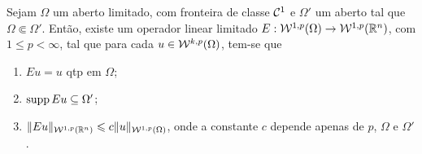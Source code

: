 \begin{tbox} \label{thm:extensao}
        Sejam $\Omega$ um aberto limitado, com fronteira de classe $\mathcal{C}^1$ e $\Omega'$ um aberto tal que $\Omega \Subset \Omega'$. Então, existe um operador linear limitado $E : \mathcal{W}^{1,p}(\Omega) \to \mathcal{W}^{1,p}(\mathbb{R} ^n)$, com $1 \leqslant p < \infty$, tal que para cada $u \in \mathcal{W}^{k,p}(\Omega)$, tem-se que
    \begin{enumerate}[leftmargin=*, label=\textbf{(\alph*)}]
        \item $Eu = u$ qtp em $\Omega$;
        \item $\mathrm{supp}\, Eu \subseteq \Omega'$;
        \item $\Vert Eu \Vert_{\mathcal{W}^{1,p}(\mathbb{R}^n)} \leqslant c \Vert u \Vert_{\mathcal{W}^{1,p}(\Omega)}$, onde a constante $c$ depende apenas de $p$, $\Omega$ e $\Omega'$.
    \end{enumerate}
\end{tbox}
